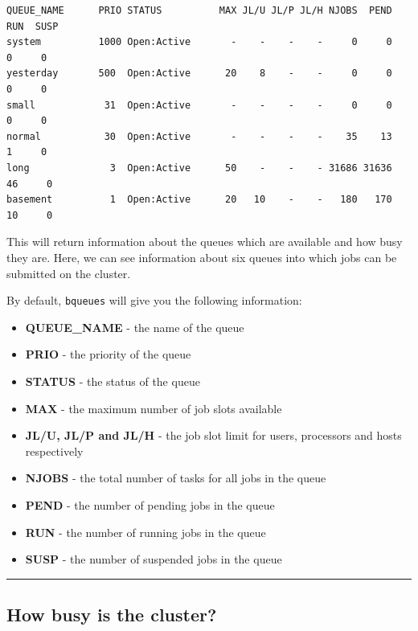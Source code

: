 \documentclass[11pt]{article}
\providecommand{\tightlist}{%
      \setlength{\itemsep}{0pt}\setlength{\parskip}{0pt}}
\begin{document}
    \begin{verbatim}
QUEUE_NAME      PRIO STATUS          MAX JL/U JL/P JL/H NJOBS  PEND   RUN  SUSP
system          1000 Open:Active       -    -    -    -     0     0     0     0
yesterday       500  Open:Active      20    8    -    -     0     0     0     0
small            31  Open:Active       -    -    -    -     0     0     0     0
normal           30  Open:Active       -    -    -    -    35    13     1     0
long              3  Open:Active      50    -    -    - 31686 31636    46     0
basement          1  Open:Active      20   10    -    -   180   170    10     0
\end{verbatim}

    This will return information about the queues which are available and
how busy they are. Here, we can see information about six queues into
which jobs can be submitted on the cluster.

By default, \texttt{bqueues} will give you the following information:

    \begin{itemize}
\tightlist
\item
  \textbf{QUEUE\_NAME} - the name of the queue
\item
  \textbf{PRIO} - the priority of the queue
\item
  \textbf{STATUS} - the status of the queue
\item
  \textbf{MAX} - the maximum number of job slots available
\item
  \textbf{JL/U, JL/P and JL/H} - the job slot limit for users,
  processors and hosts respectively
\item
  \textbf{NJOBS} - the total number of tasks for all jobs in the queue
\item
  \textbf{PEND} - the number of pending jobs in the queue
\item
  \textbf{RUN} - the number of running jobs in the queue
\item
  \textbf{SUSP} - the number of suspended jobs in the queue
\end{itemize}

    \begin{center}\rule{0.5\linewidth}{\linethickness}\end{center}

    \subsection{How busy is the cluster?}\label{how-busy-is-the-cluster}
\end{document}
